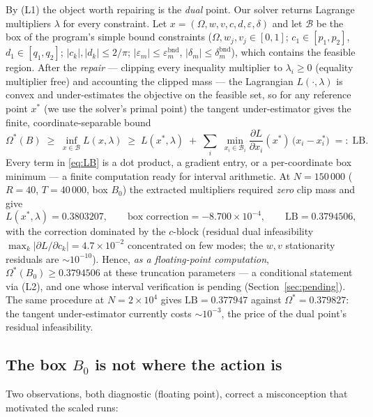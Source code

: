 \documentclass[11pt]{article}
\theoremstyle{remark}
\newcommand{\eps}{\varepsilon}
\begin{document}
By (L1) the object worth repairing is the \emph{dual} point. Our solver
returns Lagrange multipliers $\lambda$ for every constraint. Let
$x = (\Omega, w, v, c, d, \eps, \delta)$ and let $\mathcal{B}$ be the box of
the program's simple bound constraints ($\Omega, w_j, v_j \in [0,1]$;
$c_1 \in [p_1,p_2]$, $d_1 \in [q_1,q_2]$; $|c_k|, |d_k| \le 2/\pi$;
$|\eps_m| \le \eps_m^{\mathrm{bnd}}$,
$|\delta_m| \le \delta_m^{\mathrm{bnd}}$), which contains the feasible
region. After the \emph{repair} --- clipping every inequality multiplier to
$\lambda_i \ge 0$ (equality multiplier free) and accounting the clipped mass
--- the Lagrangian $L(\cdot, \lambda)$ is convex and under-estimates the
objective on the feasible set, so for any reference point $x^\ast$ (we use
the solver's primal point) the tangent under-estimator gives the finite,
coordinate-separable bound
\begin{equation}\label{eq:LB}
\Omega^\ast(B) \;\ge\; \inf_{x\in\mathcal{B}} L(x,\lambda) \;\ge\;
L(x^\ast, \lambda) \;+\; \sum_i \; \min_{x_i \in \mathcal{B}_i}
\frac{\partial L}{\partial x_i}(x^\ast)\,\bigl(x_i - x_i^\ast\bigr)
\;=:\; \mathrm{LB}.
\end{equation}
Every term in \eqref{eq:LB} is a dot product, a gradient entry, or a
per-coordinate box minimum --- a finite computation ready for interval
arithmetic. At $N = 150\,000$ ($R = 40$, $T = 40\,000$, box $B_0$) the
extracted multipliers required \emph{zero} clip mass and give
\[
L(x^\ast,\lambda) = 0.3803207, \qquad
\text{box correction} = -8.700\times10^{-4}, \qquad
\mathrm{LB} = 0.3794506,
\]
with the correction dominated by the $c$-block (residual dual
infeasibility $\max_k |\partial L / \partial c_k| = 4.7\times10^{-2}$
concentrated on few modes; the $w, v$ stationarity residuals are
$\sim 10^{-10}$). Hence, \emph{as a floating-point computation},
$\Omega^\ast(B_0) \ge 0.3794506$ at these truncation parameters --- a
conditional statement via (L2), and one whose interval verification is
pending (Section~\ref{sec:pending}). The same procedure at
$N = 2\times10^4$ gives $\mathrm{LB} = 0.377947$ against
$\Omega^\ast = 0.379827$: the tangent under-estimator currently costs
$\sim 10^{-3}$, the price of the dual point's residual infeasibility.

\subsection{The box $B_0$ is not where the action is}\label{sec:notbinding}

Two observations, both diagnostic (floating point), correct a
misconception that motivated the scaled runs:
\end{document}
